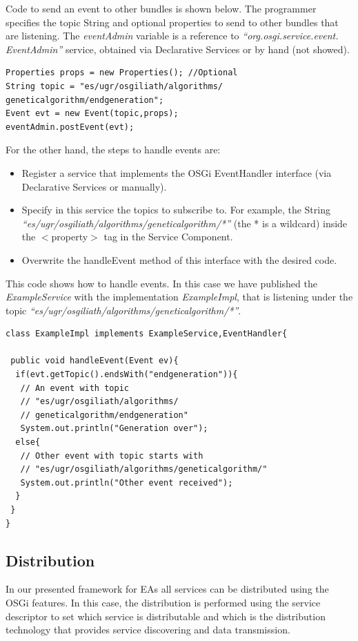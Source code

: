 \documentclass{sig-alternate}
\begin{document}
Code to send an event to other bundles is shown below. The programmer specifies the topic String and optional properties to send to other bundles that are listening. The {\em eventAdmin} variable is a reference to {\em ``org.osgi.service.event. EventAdmin''} service, obtained via Declarative Services or by hand (not showed).

\begin{lstlisting}
Properties props = new Properties(); //Optional
String topic = "es/ugr/osgiliath/algorithms/
geneticalgorithm/endgeneration";
Event evt = new Event(topic,props);
eventAdmin.postEvent(evt);
\end{lstlisting}
		
For the other hand, the steps to handle events are:
\begin{itemize}
\item Register a service that implements the OSGi EventHandler interface (via Declarative Services or manually).
\item Specify in this service the topics to subscribe to. For example, the String {\em ``es/ugr/osgiliath/algorithms/geneticalgorithm/*''} (the * is a wildcard) inside the $<$property$>$ tag in the Service Component.
\item Overwrite the handleEvent method of this interface with the desired code.
\end{itemize}

This code shows how to handle events. In this case we have published the {\em ExampleService} with the implementation {\em ExampleImpl}, that is listening under the topic {\em ``es/ugr/osgiliath/algorithms/geneticalgorithm/*''}.

\begin{lstlisting}
class ExampleImpl implements ExampleService,EventHandler{

 public void handleEvent(Event ev){
  if(evt.getTopic().endsWith("endgeneration")){
   // An event with topic 
   // "es/ugr/osgiliath/algorithms/
   // geneticalgorithm/endgeneration"
   System.out.println("Generation over");
  else{
   // Other event with topic starts with
   // "es/ugr/osgiliath/algorithms/geneticalgorithm/"
   System.out.println("Other event received");
  }
 }
}
\end{lstlisting}


\subsection{Distribution}
In our presented framework for EAs all services can be distributed using the OSGi features. In this case, the distribution is performed using the service descriptor to set which service is distributable and which is the distribution technology that provides service discovering and data transmission.
\end{document}
